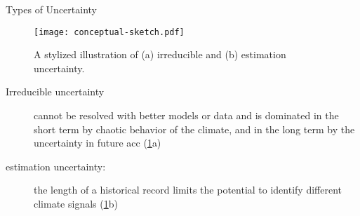 \begin{block}{Types of Uncertainty}
    \begin{figure}
        \centering
        \texttt{[image: conceptual-sketch.pdf]}
        \caption{
            A stylized illustration of (a) irreducible and (b) estimation uncertainty.
        }\label{fig:conceptual-sketch}
    \end{figure}
    \begin{description}
        \item[Irreducible uncertainty] cannot be resolved with better models or data and is dominated in the short term by chaotic behavior of the climate, and in the long term by the uncertainty in future \acrlong{acc} (\cref{fig:conceptual-sketch}a) 
        \item[estimation uncertainty:] the length of a historical record limits the potential to identify different climate signals (\cref{fig:conceptual-sketch}b)
    \end{description}
\end{block}